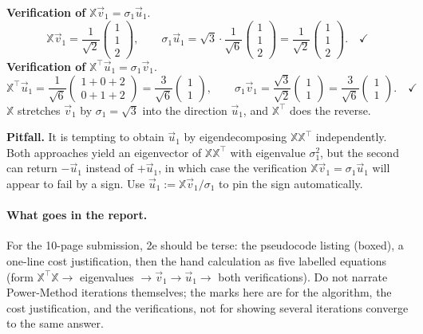 \documentclass[12pt,a4paper]{article}
\begin{document}
\begin{sanity}
\textbf{Verification of} $\mathbb{X}\vec v_1 = \sigma_1\vec u_1$.
\[
\mathbb{X}\vec v_1 = \frac{1}{\sqrt{2}}\begin{pmatrix} 1 \\ 1 \\ 2 \end{pmatrix},
\qquad
\sigma_1\vec u_1 = \sqrt{3}\cdot \frac{1}{\sqrt{6}}\begin{pmatrix} 1 \\ 1 \\ 2 \end{pmatrix} = \frac{1}{\sqrt{2}}\begin{pmatrix} 1 \\ 1 \\ 2 \end{pmatrix}. \quad\checkmark
\]
\textbf{Verification of} $\mathbb{X}^\top\vec u_1 = \sigma_1\vec v_1$.
\[
\mathbb{X}^\top\vec u_1 = \frac{1}{\sqrt{6}}\begin{pmatrix} 1+0+2 \\ 0+1+2 \end{pmatrix} = \frac{3}{\sqrt{6}}\begin{pmatrix} 1 \\ 1 \end{pmatrix},
\qquad
\sigma_1\vec v_1 = \frac{\sqrt{3}}{\sqrt{2}}\begin{pmatrix} 1 \\ 1 \end{pmatrix} = \frac{3}{\sqrt{6}}\begin{pmatrix} 1 \\ 1 \end{pmatrix}. \quad\checkmark
\]
$\mathbb{X}$ stretches $\vec v_1$ by $\sigma_1=\sqrt{3}$ into the direction $\vec u_1$, and $\mathbb{X}^\top$ does the reverse.
\end{sanity}

\begin{warn}
\textbf{Pitfall.} It is tempting to obtain $\vec u_1$ by eigendecomposing $\mathbb{X}\mathbb{X}^\top$ independently. Both approaches yield an eigenvector of $\mathbb{X}\mathbb{X}^\top$ with eigenvalue $\sigma_1^2$, but the second can return $-\vec u_1$ instead of $+\vec u_1$, in which case the verification $\mathbb{X}\vec v_1 = \sigma_1\vec u_1$ will appear to fail by a sign. Use $\vec u_1 := \mathbb{X}\vec v_1/\sigma_1$ to pin the sign automatically.
\end{warn}

\paragraph{What goes in the report.} For the 10-page submission, 2e should be terse: the pseudocode listing (boxed), a one-line cost justification, then the hand calculation as five labelled equations (form $\mathbb{X}^\top\mathbb{X} \to$ eigenvalues $\to \vec v_1 \to \vec u_1 \to$ both verifications). Do not narrate Power-Method iterations themselves; the marks here are for the algorithm, the cost justification, and the verifications, not for showing several iterations converge to the same answer.
\end{document}
